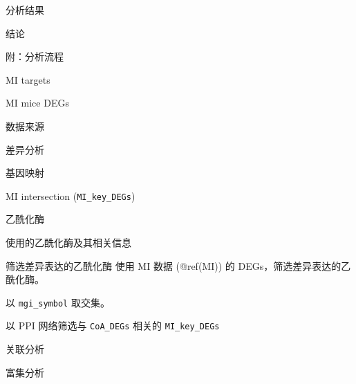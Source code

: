 \documentclass[
  ignorenonframetext,
]{beamer}
\begin{document}
\begin{frame}{分析结果}
\protect\hypertarget{results}{}
\end{frame}

\begin{frame}{结论}
\protect\hypertarget{dis}{}
\end{frame}

\begin{frame}[fragile]{附：分析流程}
\protect\hypertarget{workflow}{}
\begin{block}{MI targets}
\protect\hypertarget{mi-targets}{}
\end{block}

\begin{block}{MI mice DEGs}
\protect\hypertarget{MI}{}
\begin{block}{数据来源}
\protect\hypertarget{ux6570ux636eux6765ux6e90}{}
\end{block}

\begin{block}{差异分析}
\protect\hypertarget{ux5deeux5f02ux5206ux6790}{}
\end{block}

\begin{block}{基因映射}
\protect\hypertarget{ux57faux56e0ux6620ux5c04}{}
\end{block}
\end{block}

\begin{block}{MI intersection (\texttt{MI\_key\_DEGs})}
\protect\hypertarget{mi-intersection-mi_key_degs}{}
\end{block}

\begin{block}{乙酰化酶}
\protect\hypertarget{ux4e59ux9170ux5316ux9176}{}
\begin{block}{使用的乙酰化酶及其相关信息}
\protect\hypertarget{ux4f7fux7528ux7684ux4e59ux9170ux5316ux9176ux53caux5176ux76f8ux5173ux4fe1ux606f}{}
\end{block}

\begin{block}{筛选差异表达的乙酰化酶}
\protect\hypertarget{ux7b5bux9009ux5deeux5f02ux8868ux8fbeux7684ux4e59ux9170ux5316ux9176}{}
使用 MI 数据 (@ref(MI)) 的 DEGs，筛选差异表达的乙酰化酶。

以 \texttt{mgi\_symbol} 取交集。
\end{block}
\end{block}

\begin{block}{以 PPI 网络筛选与 \texttt{CoA\_DEGs} 相关的
\texttt{MI\_key\_DEGs}}
\protect\hypertarget{ux4ee5-ppi-ux7f51ux7edcux7b5bux9009ux4e0e-coa_degs-ux76f8ux5173ux7684-mi_key_degs}{}
\end{block}

\begin{block}{关联分析}
\protect\hypertarget{ux5173ux8054ux5206ux6790}{}
\end{block}

\begin{block}{富集分析}
\protect\hypertarget{ux5bccux96c6ux5206ux6790}{}
\end{block}
\end{frame}
\end{document}
